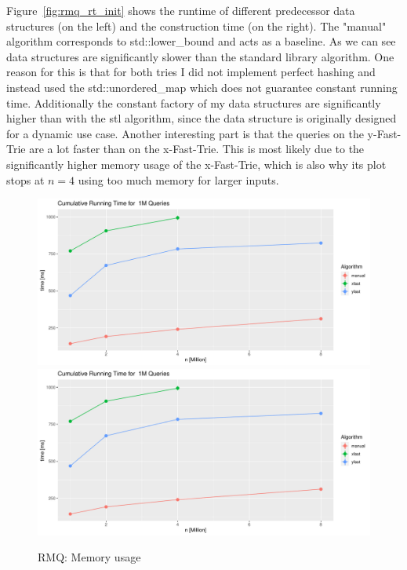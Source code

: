\documentclass[a4paper,UKenglish,cleveref, autoref, thm-restate]{lipics-v2021}
\begin{document}
Figure~\ref{fig:rmq_rt_init} shows the runtime of different predecessor data structures (on the left) and 
the construction time (on the right). The "manual" algorithm corresponds to std::lower\_bound and acts as a 
baseline. As we can see data structures are significantly slower than the standard library algorithm. One 
reason for this is that for both tries I did not implement perfect hashing and instead used the 
std::unordered\_map which does not guarantee constant running time. Additionally the constant factory of my 
data structures are significantly higher than with the stl algorithm, since the data structure is 
originally designed for a dynamic use case. Another interesting part is that the queries on the y-Fast-Trie 
are a lot faster than on the x-Fast-Trie. This is most likely due to the significantly higher memory usage 
of the x-Fast-Trie, which is also why its plot stops at $n=4$ using too much memory for larger inputs.

\begin{figure}[!htb]
 \centering
\includegraphics[page=6, width=0.9\linewidth]{../../eval/plots.pdf}
 \endminipage\hfill
 \centering
\includegraphics[page=8, width=0.9\linewidth]{../../eval/plots.pdf}
 \endminipage
 \caption{RMQ: Memory usage}
  \label{fig:rmq_mem}
\end{figure}
 
\end{document}
